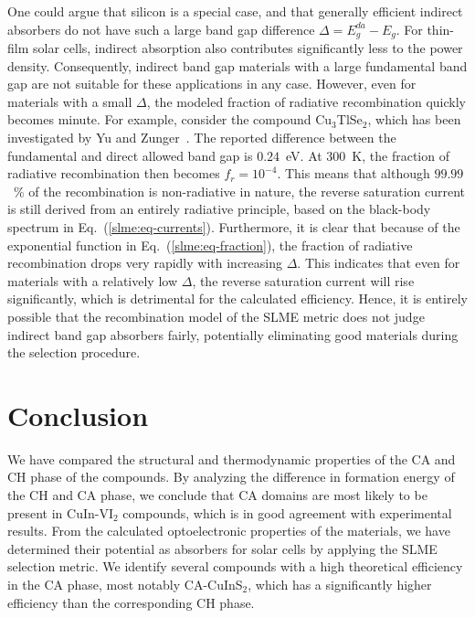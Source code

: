 \begin{refsection}
One could argue that silicon is a special case, and that generally efficient 
indirect absorbers do not have such a large band gap difference \mbox{$\Delta 
= E_g ^{da}- E_g$}. For thin-film solar cells, indirect absorption also 
contributes significantly less to the power density. Consequently, indirect 
band gap materials with a large fundamental band gap are not suitable for 
these applications in any case. However, even for materials with a small 
$\Delta$, the modeled fraction of radiative recombination quickly becomes 
minute. For example, consider the compound Cu$_3$TlSe$_2$, which has been 
investigated by Yu and Zunger~\cite{Yu2012}. The reported difference between 
the fundamental and direct allowed band gap is $0.24$~\si{\electronvolt}. At 
300~\si{\kelvin}, the fraction of radiative recombination then becomes 
\mbox{$f_r = 10^{-4}$}. This means that although $99.99$~\% of the 
recombination is non-radiative in nature, the reverse saturation current is 
still derived from an entirely radiative principle, based on the black-body 
spectrum in Eq.~(\ref{slme:eq-currents}). Furthermore, it is clear that 
because of the exponential function in Eq.~(\ref{slme:eq-fraction}), the 
fraction of radiative recombination drops very rapidly with increasing 
$\Delta$. This indicates that even for materials with a relatively low 
$\Delta$, the reverse saturation current will rise significantly, which is 
detrimental for the calculated efficiency. Hence, it is entirely possible that 
the recombination model of the SLME metric does not judge indirect band gap 
absorbers fairly, potentially eliminating good materials during the selection 
procedure.\\ 
 
\section{Conclusion} 
 
We have compared the structural and thermodynamic properties of the CA and CH 
phase of the compounds. By analyzing the difference in formation energy of the 
CH and CA phase, we conclude that CA domains are most likely to be present in 
\mbox{CuIn-VI$_2$} compounds, which is in good agreement with experimental 
results. From the calculated optoelectronic properties of the materials, we 
have determined their potential as absorbers for solar cells by applying the 
SLME selection metric. We identify several compounds with a high theoretical 
efficiency in the CA phase, most notably \mbox{CA-CuInS$_2$}, which has a 
significantly higher efficiency than the corresponding CH phase. 
 

\end{refsection}
